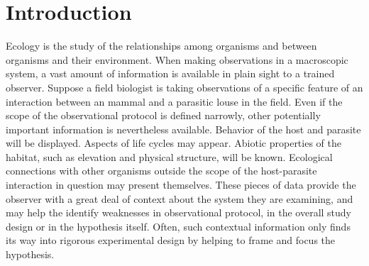 \section{Introduction}

Ecology is the study of the relationships among organisms and between organisms and their environment. When making observations in a macroscopic system, a vast amount of information is available in plain sight to a trained observer. Suppose a field biologist is taking observations of a specific feature of an interaction between an mammal and a parasitic louse in the field. Even if the scope of the observational protocol is defined narrowly, other potentially important information is nevertheless available. Behavior of the host and parasite will be displayed. Aspects of life cycles may appear. Abiotic properties of the habitat, such as elevation and physical structure, will be known. Ecological connections with other organisms outside the scope of the host-parasite interaction in question may present themselves. These pieces of data provide the observer with a great deal of context about the system they are examining, and may help the identify weaknesses in observational protocol, in the overall study design or in the hypothesis itself. Often, such contextual information only finds its way into rigorous experimental design by helping to frame and focus the hypothesis. 




